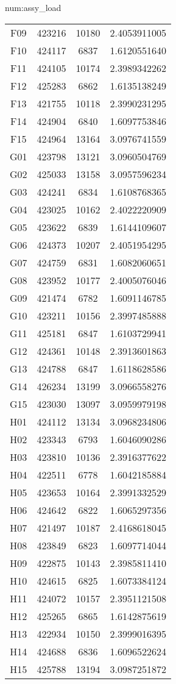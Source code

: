 \begin{numitem}{num:assy_load}
\begin{center}
\begin{longtable}{c c c c}
F09&423216&10180&2.4053911005\\
F10&424117&6837 &1.6120551640\\
F11&424105&10174&2.3989342262\\
F12&425283&6862 &1.6135138249\\
F13&421755&10118&2.3990231295\\
F14&424904&6840 &1.6097753846\\
F15&424964&13164&3.0976741559\\
G01&423798&13121&3.0960504769\\
G02&425033&13158&3.0957596234\\
G03&424241&6834 &1.6108768365\\
G04&423025&10162&2.4022220909\\
G05&423622&6839 &1.6144109607\\
G06&424373&10207&2.4051954295\\
G07&424759&6831 &1.6082060651\\
G08&423952&10177&2.4005076046\\
G09&421474&6782 &1.6091146785\\
G10&423211&10156&2.3997485888\\
G11&425181&6847 &1.6103729941\\
G12&424361&10148&2.3913601863\\
G13&424788&6847 &1.6118628586\\
G14&426234&13199&3.0966558276\\
G15&423030&13097&3.0959979198\\
H01&424112&13134&3.0968234806\\
H02&423343&6793 &1.6046090286\\
H03&423810&10136&2.3916377622\\
H04&422511&6778 &1.6042185884\\
H05&423653&10164&2.3991332529\\
H06&424642&6822 &1.6065297356\\
H07&421497&10187&2.4168618045\\
H08&423849&6823 &1.6097714044\\
H09&422875&10143&2.3985811410\\
H10&424615&6825 &1.6073384124\\
H11&424072&10157&2.3951121508\\
H12&425265&6865 &1.6142875619\\
H13&422934&10150&2.3999016395\\
H14&424688&6836 &1.6096522624\\
H15&425788&13194&3.0987251872\\

\end{longtable}
\end{center}
\end{numitem}
